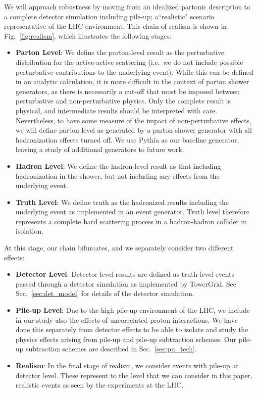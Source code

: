 \documentclass[11pt,letterpaper]{article}
\DeclareRobustCommand{\Sec}[1]{Sec.~\ref{#1}}
\DeclareRobustCommand{\Fig}[1]{Fig.~\ref{#1}}
\begin{document}
We will approach robustness by moving from an idealized partonic description to a complete detector simulation including pile-up; a``realistic" scenario representative of the LHC environment.
%
This chain of realism is shown in \Fig{fig:realism}, which illustrates the following stages:
%
\begin{itemize}
\item {\bf Parton Level}: We define the parton-level result as the
  perturbative distribution for the active-active scattering (i.e.\ we
  do not include possible perturbative contributions to the underlying
  event).
  While this can be defined in an analytic calculation, it is
  more difficult in the context of parton shower generators, as
  there is necessarily a cut-off that must be imposed between
  perturbative and non-perturbative physics.
  Only the complete result
  is physical, and intermediate results should be interpreted with
  care.
  Nevertheless, to have some measure of the impact of
  non-perturbative effects, we will define parton level as generated
  by a parton shower generator with all hadronization effects turned
  off.
  We use Pythia  \cite{Sjostrand:2006za,Sjostrand:2007gs}  as our baseline generator, leaving a study of additional generators to future work.
%
\item {\bf Hadron Level}: We define the hadron-level result as that including hadronization in the shower, but not including any effects from the underlying event.
%
\item {\bf Truth Level}:  We define truth as the hadronized results including the underlying event as implemented in an event generator.
%
Truth level therefore represents a complete hard scattering process in a hadron-hadron collider in isolation.
%
\end{itemize}
At this stage, our chain bifurcates, and we separately consider two different effects:
\begin{itemize}
\item {\bf Detector Level}: Detector-level results are defined as truth-level events passed through a detector simulation as implemented by TowerGrid. See \Sec{sec:det_model} for details of the detector simulation.
%
\item {\bf Pile-up Level}: Due to the high pile-up environment of the LHC, we include in our study also the effects of uncorrelated proton interactions. We have done this separately from detector effects to be able to isolate and study the physics effects arising from pile-up and pile-up subtraction schemes. Our pile-up subtraction schemes are described in \Sec{sec:pu_tech}.
%
\item {\bf Realism}: In the final stage of realism, we consider events with pile-up at detector
  level.
  These represent to the level that we can consider in this
  paper, realistic events as seen by the experiments at the
  LHC.
\end{itemize}
\end{document}

